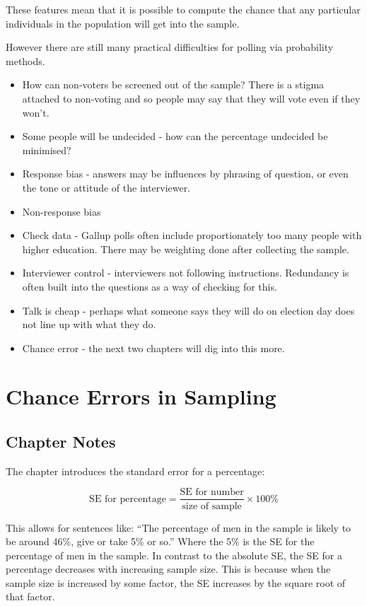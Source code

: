 \documentclass[
]{book}
\providecommand{\tightlist}{%
  \setlength{\itemsep}{0pt}\setlength{\parskip}{0pt}}
\begin{document}
These features mean that it is possible to compute the chance that any particular individuals in the population will get into the sample.

However there are still many practical difficulties for polling via probability methods.

\begin{itemize}
\tightlist
\item
  How can non-voters be screened out of the sample? There is a stigma attached to non-voting and so people may say that they will vote even if they won't.
\item
  Some people will be undecided - how can the percentage undecided be minimised?
\item
  Response bias - answers may be influences by phrasing of question, or even the tone or attitude of the interviewer.
\item
  Non-response bias
\item
  Check data - Gallup polls often include proportionately too many people with higher education. There may be weighting done after collecting the sample.
\item
  Interviewer control - interviewers not following instructions. Redundancy is often built into the questions as a way of checking for this.
\item
  Talk is cheap - perhaps what someone says they will do on election day does not line up with what they do.
\item
  Chance error - the next two chapters will dig into this more.
\end{itemize}

\hypertarget{chance_errors}{%
\chapter{Chance Errors in Sampling}\label{chance_errors}}

\hypertarget{chapter-notes-19}{%
\section{Chapter Notes}\label{chapter-notes-19}}

The chapter introduces the standard error for a percentage:

\[
\text{SE for percentage} = \frac{\text{SE for number}}{\text{size of sample}} \times 100\%
\]

This allows for sentences like: ``The percentage of men in the sample is likely to be around 46\%, give or take 5\% or so.'' Where the 5\% is the SE for the percentage of men in the sample. In contrast to the absolute SE, the SE for a percentage decreases with increasing sample size. This is because when the sample size is increased by some factor, the SE increases by the square root of that factor.
\end{document}

